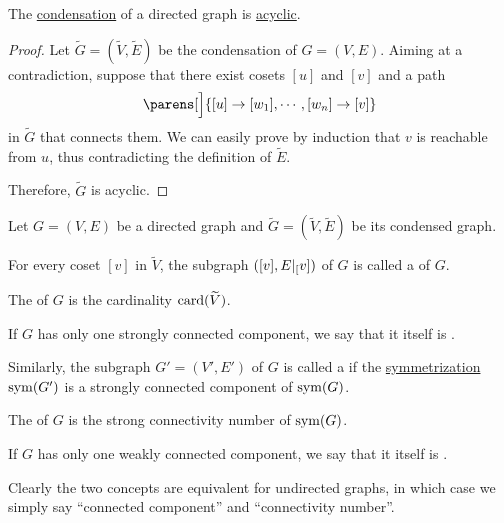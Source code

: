 \begin{proposition}\label{thm:graph_condensation_is_acyclic_dag}
  The \hyperref[def:graph_condensation]{condensation} of a directed graph is \hyperref[def:graph_cycle]{acyclic}.
\end{proposition}
\begin{proof}
  Let \( \widetilde{G} = (\widetilde{V}, \widetilde{E}) \) be the condensation of \( G = (V, E) \). Aiming at a contradiction, suppose that there exist cosets \( [u] \) and \( [v] \) and a path
  \begin{equation*}
    \parens[\Big]{ [u] \to [w_1], \cdots, [w_n] \to [v] }
  \end{equation*}
  in \( \widetilde{G} \) that connects them. We can easily prove by induction that \( v \) is reachable from \( u \), thus contradicting the definition of \( \widetilde{E} \).

  Therefore, \( \widetilde{G} \) is acyclic.
\end{proof}

\begin{definition}\label{def:graph_connectedness}
  Let \( G = (V, E) \) be a directed graph and \( \widetilde{G} = (\widetilde{V}, \widetilde{E}) \) be its condensed graph.

  \begin{thmenum}
     For every coset \( [v] \) in \( \widetilde{V} \), the subgraph \( ([v], E\vert_[v]) \) of \( G \) is called a  of \( G \).

    The  of \( G \) is the cardinality \( \operatorname{card}(\widetilde{V}) \).

    If \( G \) has only one strongly connected component, we say that it itself is .

     Similarly, the subgraph \( G' = (V', E') \) of \( G \) is called a  if the \hyperref[def:graph/symmetrization]{symmetrization} \( \operatorname{sym}(G') \) is a strongly connected component of \( \operatorname{sym}(G) \).

    The  of \( G \) is the strong connectivity number of \( \operatorname{sym}(G) \).

    If \( G \) has only one weakly connected component, we say that it itself is .
  \end{thmenum}

  Clearly the two concepts are equivalent for undirected graphs, in which case we simply say \enquote{connected component} and \enquote{connectivity number}.
\end{definition}

